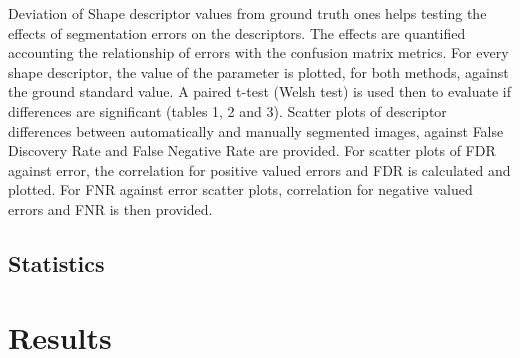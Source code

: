 \documentclass{frontiersSCNS} %
\begin{document}
Deviation of Shape descriptor values from ground truth ones helps testing the effects of segmentation errors on the descriptors. The effects are quantified accounting the relationship of errors with the confusion matrix metrics. For every shape descriptor, the value of the parameter is plotted, for both methods, against the ground standard value. A paired t-test (Welsh test) is used then to evaluate if differences are significant (tables 1, 2 and 3). Scatter plots of descriptor differences between automatically and manually segmented images, against False Discovery Rate and False Negative Rate are provided. For scatter plots of FDR against error, the correlation for positive valued errors and FDR is calculated and plotted. For FNR against error scatter plots, correlation for negative valued errors and FNR is then provided.





\subsection{Statistics }


\section{Results}
\end{document}
